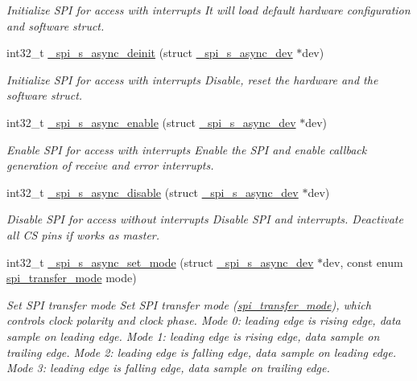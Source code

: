 \begin{DoxyCompactItemize}
\begin{DoxyCompactList}\small\item\em Initialize S\+PI for access with interrupts It will load default hardware configuration and software struct. \end{DoxyCompactList}\item 
int32\+\_\+t \hyperlink{group__hpl__spi_gaeeb792ee0ed50ffd0dd57d94211cd9ed}{\+\_\+spi\+\_\+s\+\_\+async\+\_\+deinit} (struct \hyperlink{group__hpl__spi_ga7ac9e8d408bc498841e8e461ad8656aa}{\+\_\+spi\+\_\+s\+\_\+async\+\_\+dev} $\ast$dev)
\begin{DoxyCompactList}\small\item\em Initialize S\+PI for access with interrupts Disable, reset the hardware and the software struct. \end{DoxyCompactList}\item 
int32\+\_\+t \hyperlink{group__hpl__spi_ga506b300340ae2cd06b640f47e05f9fee}{\+\_\+spi\+\_\+s\+\_\+async\+\_\+enable} (struct \hyperlink{group__hpl__spi_ga7ac9e8d408bc498841e8e461ad8656aa}{\+\_\+spi\+\_\+s\+\_\+async\+\_\+dev} $\ast$dev)
\begin{DoxyCompactList}\small\item\em Enable S\+PI for access with interrupts Enable the S\+PI and enable callback generation of receive and error interrupts. \end{DoxyCompactList}\item 
int32\+\_\+t \hyperlink{group__hpl__spi_gaeb0c400081a9de6a4ff574be671d788c}{\+\_\+spi\+\_\+s\+\_\+async\+\_\+disable} (struct \hyperlink{group__hpl__spi_ga7ac9e8d408bc498841e8e461ad8656aa}{\+\_\+spi\+\_\+s\+\_\+async\+\_\+dev} $\ast$dev)
\begin{DoxyCompactList}\small\item\em Disable S\+PI for access without interrupts Disable S\+PI and interrupts. Deactivate all CS pins if works as master. \end{DoxyCompactList}\item 
int32\+\_\+t \hyperlink{group__hpl__spi_gadf01869e506fd07f13dcf6afbcf07d7e}{\+\_\+spi\+\_\+s\+\_\+async\+\_\+set\+\_\+mode} (struct \hyperlink{group__hpl__spi_ga7ac9e8d408bc498841e8e461ad8656aa}{\+\_\+spi\+\_\+s\+\_\+async\+\_\+dev} $\ast$dev, const enum \hyperlink{group__hpl__spi_ga9c30fdfffba6be76b4044ccb17b218e5}{spi\+\_\+transfer\+\_\+mode} mode)
\begin{DoxyCompactList}\small\item\em Set S\+PI transfer mode Set S\+PI transfer mode (\hyperlink{group__hpl__spi_ga9c30fdfffba6be76b4044ccb17b218e5}{spi\+\_\+transfer\+\_\+mode}), which controls clock polarity and clock phase. Mode 0\+: leading edge is rising edge, data sample on leading edge. Mode 1\+: leading edge is rising edge, data sample on trailing edge. Mode 2\+: leading edge is falling edge, data sample on leading edge. Mode 3\+: leading edge is falling edge, data sample on trailing edge. \end{DoxyCompactList}\item 

\end{DoxyCompactItemize}
